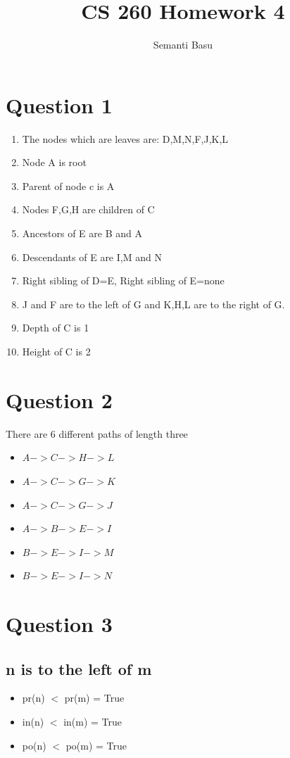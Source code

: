 \documentclass{article}
\begin{document}
\title {CS 260 Homework 4}
\author{Semanti Basu}
\maketitle


\section*{Question 1}
\begin{enumerate}
\item The nodes which are leaves are: D,M,N,F,J,K,L
\item Node A is root
\item Parent of node c is A
\item Nodes F,G,H are children of C
\item Ancestors of E are B and A
\item Descendants of E are I,M and N
\item Right sibling of D=E, Right sibling of E=none
\item J and F are to the left of G and K,H,L are to the right of G.
\item Depth of C is 1
\item Height of C is 2
\end{enumerate}

\section*{Question 2}
There are 6 different paths of length three
\begin{itemize}
\item $A->C->H->L$
\item $A->C->G->K$
\item $A->C->G->J$
\item $A->B->E->I$
\item $B->E->I->M$
\item $B->E->I->N$
\end{itemize}

\section*{Question 3}
\subsection*{n is to the left of m}
\begin{itemize}
\item pr(n) $<$ pr(m) = True
\item in(n) $<$ in(m) = True
\item po(n) $<$ po(m) = True
\end{itemize}
\end{document}
